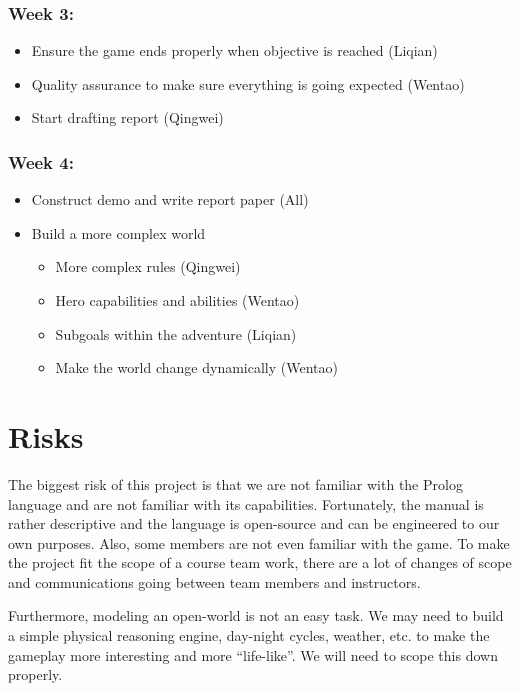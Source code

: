 \documentclass[10pt]{article}
\begin{document}
\subsubsection*{Week 3:}

\begin{itemize}
\item Ensure the game ends properly when objective is reached (Liqian)
\item Quality assurance to make sure everything is going expected (Wentao)
\item Start drafting report (Qingwei)
\end{itemize}


\subsubsection*{Week 4:}

\begin{itemize}
\item Construct demo and write report paper (All)
\item Build a more complex world
    \begin{itemize}
    \item More complex rules (Qingwei)
    \item Hero capabilities and abilities (Wentao)
    \item Subgoals within the adventure (Liqian)
    \item Make the world change dynamically (Wentao)
    \end{itemize}
\end{itemize}



\section{Risks}

The biggest risk of this project is that we are not familiar with the Prolog language and are not familiar with its capabilities. Fortunately, the manual is rather descriptive and the language is open-source and can be engineered to our own purposes. Also, some members are not even familiar with the game. To make the project fit the scope of a course team work, there are a lot of changes of scope and communications going between team members and instructors. 

Furthermore, modeling an open-world is not an easy task. We may need to build a simple physical reasoning engine, day-night cycles, weather, etc. to make the gameplay more interesting and more “life-like”. We will need to scope this down properly.
\end{document}
